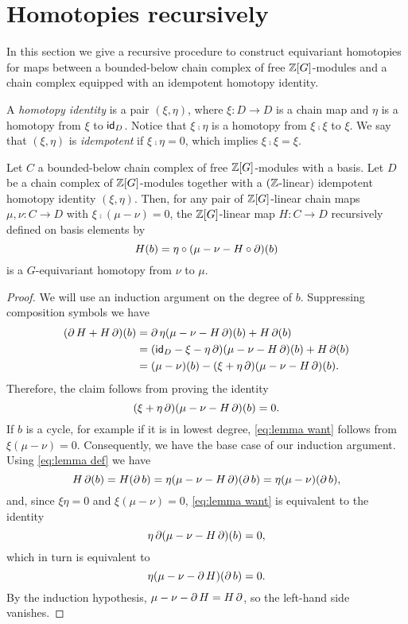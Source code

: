 
\section{Homotopies recursively}\label{s:equivariant homotopy general}

\noindent In this section we give a recursive procedure to construct equivariant homotopies for maps between a bounded-below chain complex of free $\mathbb{Z}[G]$-modules and a chain complex equipped with an idempotent homotopy identity.

\begin{definition}
	A \textit{homotopy identity} is a pair $(\xi,\eta)$, where $\xi \colon D \to D$ is a chain map and $\eta$ is a homotopy from $\xi$ to $\mathsf{id}_D$.
	Notice that $\xi \comp \eta$ is a homotopy from $\xi \comp \xi$ to $\xi$.
	We say that $(\xi, \eta)$ is \textit{idempotent} if $\xi \comp \eta = 0$, which implies $\xi \comp \xi = \xi$.
\end{definition}

\begin{theorem}\label{t:recursive_homotopy}
	Let $C$ a bounded-below chain complex of free $\mathbb{Z}[G]$-modules with a basis.
	Let $D$ be a chain complex of $\mathbb{Z}[G]$-modules together with a $(\mathbb{Z}$-linear$)$ idempotent homotopy identity $(\xi, \eta)$.
	Then, for any pair of $\mathbb{Z}[G]$-linear chain maps $\mu,\nu \colon C \to D$ with $\xi \comp (\mu -\nu) = 0$, the $\mathbb{Z}[G]$-linear map $H \colon C \to D$ recursively defined on basis elements by
	\begin{equation}\label{eq:lemma def}
		H(b) = \eta \mathbin{\circ} (\mu - \nu - H \mathbin{\circ} \operatorname{\partial})(b)
	\end{equation}
	is a $G$-equivariant homotopy from $\nu$ to $\mu$.
\end{theorem}

\begin{proof}
	We will use an induction argument on the degree of $b$.
	Suppressing composition symbols we have
	\begin{align*}
		(\operatorname{\partial} H + H \operatorname{\partial})(b)
		&= \operatorname{\partial} \eta(\mu - \nu - H \operatorname{\partial})(b) + H \operatorname{\partial} (b) \\
		&= (\mathsf{id}_D - \xi - \eta \operatorname{\partial})(\mu - \nu - H \operatorname{\partial})(b) + H \operatorname{\partial}(b) \\
		&= (\mu-\nu)(b) - (\xi + \eta \operatorname{\partial})(\mu - \nu - H \operatorname{\partial})(b).
	\end{align*}
	Therefore, the claim follows from proving the identity
	\begin{equation}\label{eq:lemma want}
		(\xi + \eta \operatorname{\partial})(\mu - \nu - H \operatorname{\partial})(b) = 0.
	\end{equation}
	If $b$ is a cycle, for example if it is in lowest degree, \eqref{eq:lemma want} follows from $\xi(\mu-\nu) = 0$.
	Consequently, we have the base case of our induction argument.
	Using \eqref{eq:lemma def} we have
	\[
	H\operatorname{\partial} (b) = H(\operatorname{\partial} b) = \eta(\mu-\nu-H\operatorname{\partial})(\operatorname{\partial} b) = \eta(\mu-\nu)(\operatorname{\partial} b),
	\]
	and, since $\xi \eta = 0$ and $\xi(\mu-\nu)=0$, \eqref{eq:lemma want} is equivalent to the identity
	\[
	\eta \operatorname{\partial} (\mu-\nu - H\operatorname{\partial})(b) = 0,
	\]
	which in turn is equivalent to
	\[
	\eta (\mu-\nu - \operatorname{\partial} H)(\operatorname{\partial} b) = 0.
	\]
	By the induction hypothesis, $\mu-\nu-\operatorname{\partial} H = H\operatorname{\partial}$, so the left-hand side vanishes.
\end{proof}

